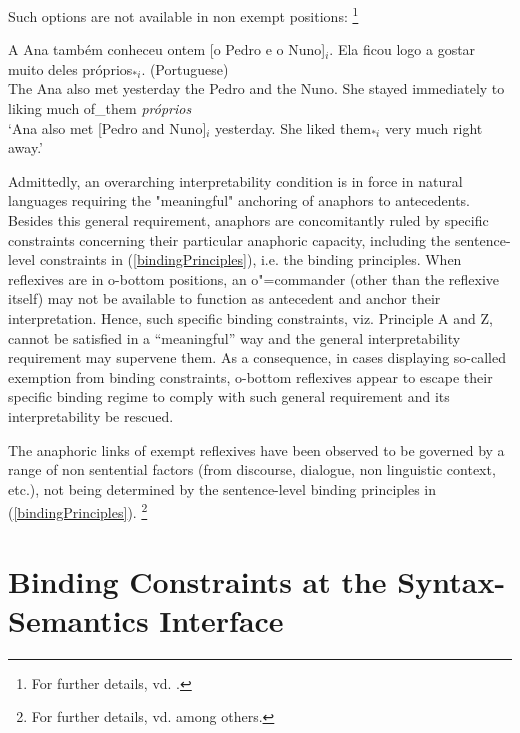 \documentclass[output=paper
,modfonts
,nonflat]{langsci/langscibook}
\begin{document}
Such options are not available in non exempt positions:%
%
\footnote{
For further details, vd. \citep{branco:ldrefl99}.
}
%


\begin{exe}
\label{portugueseLDreflexive}
\ex
\gll  A Ana tamb\'{e}m conheceu ontem [o Pedro e o Nuno]$_{i}$. Ela ficou logo a gostar muito
deles pr\'{o}prios$_{*i}$. (Portuguese)\\ 
The Ana also met yesterday the Pedro and the Nuno. She stayed immediately to liking much of\_them
\emph{pr\'{o}prios}\\
\trans `Ana also met [Pedro and Nuno]$_{i}$ yesterday. She liked them$_{*i}$ very much right
away.'
\end{exe}




Admittedly, an overarching interpretability condition is in force in natural languages
requiring the "meaningful" anchoring of anaphors to antecedents. Besides this general 
requirement, anaphors are concomitantly ruled by specific constraints concerning their 
particular anaphoric capacity, including the sentence-level constraints in (\ref{bindingPrinciples}), i.e. the binding principles.
When reflexives are in o-bottom positions, an o"=commander (other than the reflexive itself) may not be
available to function as antecedent and anchor their interpretation. Hence, such specific
binding constraints, viz. Principle A and Z, cannot be satisfied in a ``meaningful'' way and the general
interpretability requirement may supervene them. As a consequence, in cases displaying so-called
exemption from binding constraints, o-bottom reflexives appear to escape their specific binding regime
to comply with such general requirement and its interpretability be rescued. 

The anaphoric links of exempt reflexives have been observed to be
governed by a range of non sentential factors (from discourse, dialogue, non linguistic context,
etc.), not being determined by the sentence-level binding principles in (\ref{bindingPrinciples}).%
%
\footnote{For further details, vd. \citep{kuno:func87, zribi:pview89, golde:diss99} among others.
} 




\section{Binding Constraints at the Syntax-Semantics Interface\label{sem}}
\end{document}
